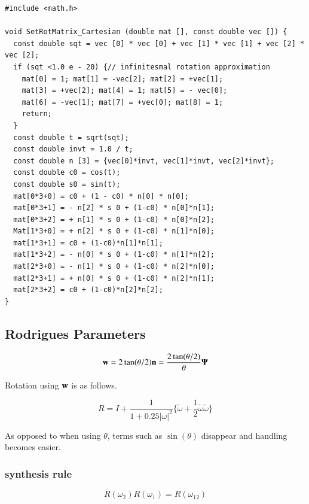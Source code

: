 \begin{lstlisting}
#include <math.h>

void SetRotMatrix_Cartesian (double mat [], const double vec []) {
  const double sqt = vec [0] * vec [0] + vec [1] * vec [1] + vec [2] * vec [2];
  if (sqt <1.0 e - 20) {// infinitesmal rotation approximation
    mat[0] = 1; mat[1] = -vec[2]; mat[2] = +vec[1];
    mat[3] = +vec[2]; mat[4] = 1; mat[5] = - vec[0];
    mat[6] = -vec[1]; mat[7] = +vec[0]; mat[8] = 1;
    return;
  }
  const double t = sqrt(sqt);
  const double invt = 1.0 / t;
  const double n [3] = {vec[0]*invt, vec[1]*invt, vec[2]*invt};
  const double c0 = cos(t);
  const double s0 = sin(t);
  mat[0*3+0] = c0 + (1 - c0) * n[0] * n[0];
  mat[0*3+1] = - n[2] * s 0 + (1-c0) * n[0]*n[1];
  mat[0*3+2] = + n[1] * s 0 + (1-c0) * n[0]*n[2];
  Mat[1*3+0] = + n[2] * s 0 + (1-c0) * n[1]*n[0];
  mat[1*3+1] = c0 + (1-c0)*n[1]*n[1];
  mat[1*3+2] = - n[0] * s 0 + (1-c0) * n[1]*n[2];
  mat[2*3+0] = - n[1] * s 0 + (1-c0) * n[2]*n[0];
  mat[2*3+1] = + n[0] * s 0 + (1-c0) * n[2]*n[1];
  mat[2*3+2] = c0 + (1-c0)*n[2]*n[2];
}
\end{lstlisting}

\subsection{Rodrigues Parameters}


\begin{equation}
\mathbf{w}=2\tan(\theta/2)\mathbf{n}=\frac{2\tan(\theta/2)}{\theta}\mathbf{\Psi}
\end{equation}

Rotation using $\mathbf{w}$ is as follows.

\begin{tcolorbox}[title=rotation matrix]
\begin{equation}
R=I+\frac{1}{1+0.25|\omega|^2}\{\tilde{\omega}+\frac{1}{2}\tilde{\omega}\tilde{\omega}\}
\end{equation}
\end{tcolorbox}


As opposed to when using $\theta$, terms such as $\sin(\theta)$ disappear and handling becomes easier.

\subsubsection{synthesis rule}


\begin{equation}
R(\omega_2)R(\omega_1)=R(\omega_{12})
\end{equation}


